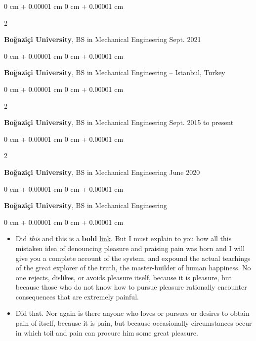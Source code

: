 \documentclass[10pt, letterpaper]{article}
\newenvironment{highlights}{
    \begin{itemize}[
        topsep=0.10 cm,
        parsep=0.10 cm,
        partopsep=0pt,
        itemsep=0pt,
        leftmargin=0 cm + 10pt
    ]
}{
    \end{itemize}
} %
\newenvironment{onecolentry}{
    \begin{adjustwidth}{
        0 cm + 0.00001 cm
    }{
        0 cm + 0.00001 cm
    }
}{
    \end{adjustwidth}
} %
\newenvironment{twocolentry}[2][]{
    \onecolentry
    \def\secondColumn{#2}
    \setcolumnwidth{\fill, 4.5 cm}
    \begin{paracol}{2}
}{
    \switchcolumn \raggedleft \secondColumn
    \end{paracol}
    \endonecolentry
} %
\begin{document}
        \vspace{0.2 cm}

        \begin{twocolentry}{
            Sept. 2021
        }
            \textbf{Boğaziçi University}, BS in Mechanical Engineering\end{twocolentry}



        \vspace{0.2 cm}

        \begin{onecolentry}
            \textbf{Boğaziçi University}, BS in Mechanical Engineering -- Istanbul, Turkey\end{onecolentry}



        \vspace{0.2 cm}

        \begin{twocolentry}{
            Sept. 2015 to present
        }
            \textbf{Boğaziçi University}, BS in Mechanical Engineering\end{twocolentry}



        \vspace{0.2 cm}

        \begin{twocolentry}{
            June 2020
        }
            \textbf{Boğaziçi University}, BS in Mechanical Engineering\end{twocolentry}



        \vspace{0.2 cm}

        \begin{onecolentry}
            \textbf{Boğaziçi University}, BS in Mechanical Engineering\end{onecolentry}

        \vspace{0.10 cm}
        \begin{onecolentry}
            \begin{highlights}
                \item Did \textit{this} and this is a \textbf{bold} \href{https://example.com}{link}. But I must explain to you how all this mistaken idea of denouncing pleasure and praising pain was born and I will give you a complete account of the system, and expound the actual teachings of the great explorer of the truth, the master-builder of human happiness. No one rejects, dislikes, or avoids pleasure itself, because it is pleasure, but because those who do not know how to pursue pleasure rationally encounter consequences that are extremely painful.
                \item Did that. Nor again is there anyone who loves or pursues or desires to obtain pain of itself, because it is pain, but because occasionally circumstances occur in which toil and pain can procure him some great pleasure.
            \end{highlights}
        \end{onecolentry}
\end{document}
